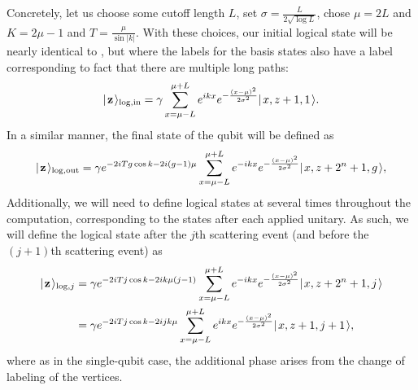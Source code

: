 \documentclass[../thesis-main/thesis-main]{subfiles}
\begin{document}
Concretely, let us choose some cutoff length $L$, set $\sigma = \frac{L}{2\sqrt{\log L}}$, chose $\mu = 2L$ and $K = 2\mu-1$ and $T = \frac{\mu}{\sin |k|}$.  With these choices, our initial logical state will be nearly identical to , but where the labels for the basis states also have a label corresponding to fact that there are multiple long paths:
\begin{align}
  |\mspace{2mu} \mathbf{z} \mspace{2mu} \rangle_{\text{log},\text{in}} = \gamma \sum_{x = \mu - L}^{\mu + L} e^{ i k x} e^{ - \frac{(x-\mu)^2}{2\sigma^2}} |\mspace{2mu} x,z+1,1 \mspace{2mu} \rangle.
\end{align}
In a similar manner, the final state of the qubit will be defined as
 \begin{align}
  |\mspace{2mu} \mathbf{z} \mspace{2mu} \rangle_{\text{log},\text{out}} = \gamma e^{- 2 i Tg \cos k - 2 i (g-1)\mu } \sum_{x = \mu - L}^{\mu + L} e^{ -i k x} e^{ - \frac{(x-\mu)^2}{2\sigma^2}} |\mspace{2mu} x,z+2^{n}+1,g \mspace{2mu} \rangle,
\end{align}
Additionally, we will need to define logical states at several times throughout the computation, corresponding to the states after each applied unitary.  As such, we will define the logical state after the $j$th scattering event (and before the $(j+1)$th scattering event) as
\begin{align}
  |\mspace{2mu} \mathbf{z} \mspace{2mu} \rangle_{\text{log},j} &=  \gamma e^{- 2 i Tj \cos k - 2 i k \mu(j-1)} \sum_{x = \mu - L}^{\mu + L} e^{ -i k x} e^{ - \frac{(x-\mu)^2}{2\sigma^2}} |\mspace{2mu} x,z+2^n+1,j \mspace{2mu} \rangle\\
  &=\gamma e^{-2i Tj \cos k- 2 i j k \mu}\sum_{x = \mu - L}^{\mu + L} e^{ i k x} e^{ - \frac{(x-\mu)^2}{2\sigma^2}} |\mspace{2mu} x,z+1,j+1 \mspace{2mu} \rangle, 
\end{align}
where as in the single-qubit case, the additional phase arises from the change of labeling of the vertices.
\end{document}
